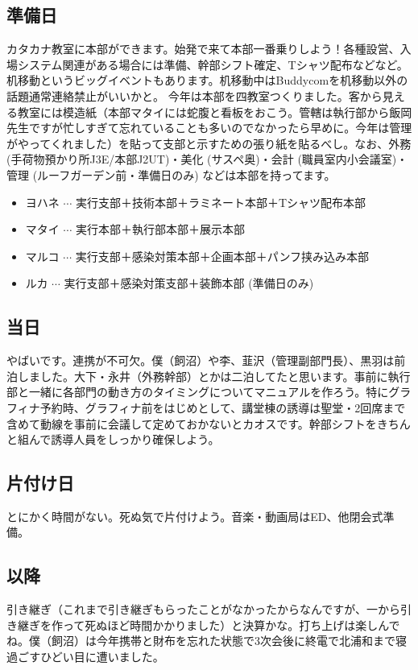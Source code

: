 \documentclass[a4paper]{ltjsreport}
\begin{document}
\subsection{準備日}
カタカナ教室に本部ができます。始発で来て本部一番乗りしよう！各種設営、入場システム関連がある場合には準備、幹部シフト確定、Tシャツ配布などなど。机移動というビッグイベントもあります。机移動中はBuddycomを机移動以外の話題通常連絡禁止がいいかと。
今年は本部を四教室つくりました。客から見える教室には模造紙（本部マタイには蛇腹と看板をおこう。管轄は執行部から飯岡先生ですが忙しすぎて忘れていることも多いのでなかったら早めに。今年は管理がやってくれました）を貼って支部と示すための張り紙を貼るべし。なお、外務 (手荷物預かり所J3E/本部J2UT)・美化 (サスペ奥)・会計 (職員室内小会議室)・管理 (ルーフガーデン前・準備日のみ) などは本部を持ってます。
\begin{itemize}
  \item ヨハネ $\cdots$ 実行支部＋技術本部＋ラミネート本部＋Tシャツ配布本部
  \item マタイ $\cdots$ 実行本部＋執行部本部＋展示本部
  \item マルコ $\cdots$ 実行支部＋感染対策本部＋企画本部＋パンフ挟み込み本部
  \item ルカ $\cdots$ 実行支部＋感染対策支部＋装飾本部 (準備日のみ)
\end{itemize}

\subsection{当日}
やばいです。連携が不可欠。僕（飼沼）や李、韮沢（管理副部門長）、黒羽は前泊しました。大下・永井（外務幹部）とかは二泊してたと思います。事前に執行部と一緒に各部門の動き方のタイミングについてマニュアルを作ろう。特にグラフィナ予約時、グラフィナ前をはじめとして、講堂棟の誘導は聖堂・2回席まで含めて動線を事前に会議して定めておかないとカオスです。幹部シフトをきちんと組んで誘導人員をしっかり確保しよう。

\subsection{片付け日}
とにかく時間がない。死ぬ気で片付けよう。音楽・動画局はED、他閉会式準備。

\subsection{以降}
引き継ぎ（これまで引き継ぎもらったことがなかったからなんですが、一から引き継ぎを作って死ぬほど時間かかりました）と決算かな。打ち上げは楽しんでね。僕（飼沼）は今年携帯と財布を忘れた状態で3次会後に終電で北浦和まで寝過ごすひどい目に遭いました。
\end{document}
